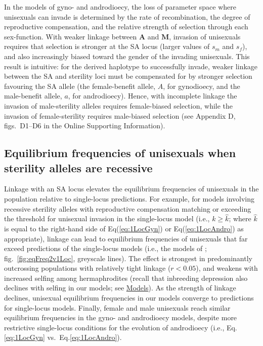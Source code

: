 \documentclass{article}
\begin{document}
In the models of gyno- and androdioecy, the loss of parameter space where unisexuals can invade is determined by the rate of recombination, the degree of reproductive compensation, and the relative strength of selection through each sex-function. With weaker linkage between $\mathbf{A}$ and $\mathbf{M}$, invasion of unisexuals requires that selection is stronger at the SA locus (larger values of $s_m$ and $s_f$), and also increasingly biased toward the gender of the invading unisexuals. This result is intuitive: for the derived haplotype to successfully invade, weaker linkage between the SA and sterility loci must be compensated for by stronger selection favouring the SA allele (the female-benefit allele, $A$, for gynodioecy, and the male-benefit allele, $a$, for androdioecy). Hence, with incomplete linkage the invasion of male-sterility alleles requires female-biased selection, while the invasion of female-sterility requires male-biased selection (see Appendix D, figs.~D1--D6 in the Online Supporting Information). 

\subsection*{Equilibrium frequencies of unisexuals when sterility alleles are recessive}

Linkage with an SA locus elevates the equilibrium frequencies of unisexuals in the population relative to single-locus predictions. For example, for models involving recessive sterility alleles with reproductive compensation matching or exceeding the threshold for unisexual invasion in the single-locus model (i.e., $k \geq \hat{k}$; where $\hat{k}$ is equal to the right-hand side of Eq(\ref{eq:1LocGyn}) or Eq(\ref{eq:1LocAndro}) as appropriate), linkage can lead to equilibrium frequencies of unisexuals that far exceed predictions of the single-locus models (i.e., the models of \citealt{Charlesworth1978a}; fig.~\ref{fig:eqFreq2v1Loc}, greyscale lines). The effect is strongest in predominantly outcrossing populations with relatively tight linkage ($r < 0.05$), and weakens with increased selfing among hermaphrodites (recall that inbreeding depression also declines with selfing in our models; see \hyperref[sec:Models]{Models}). As the strength of linkage declines, unisexual equilibrium frequencies in our models converge to predictions for single-locus models. Finally, female and male unisexuals reach similar equilibrium frequencies in the gyno- and androdioecy models, despite more restrictive single-locus conditions for the evolution of androdioecy (i.e., Eq.\ref{eq:1LocGyn} vs.~Eq.\ref{eq:1LocAndro}).
\end{document}
